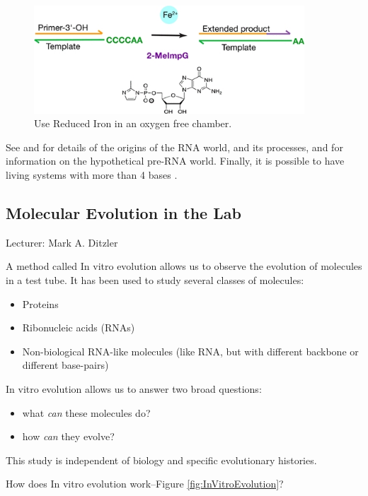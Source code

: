 \documentclass[]{article}
\begin{document}
\begin{figure}[H]
	\caption{Use Reduced Iron in an oxygen free chamber.}\label{fig:RNA_polymerization_via_iron}
	\includegraphics[width=0.9\textwidth]{RNA_polymerization_via_iron}
\end{figure}

See \cite{robertson2012origins} and  \cite{joyce2018protocells} for details of the origins of the RNA world, and its processes, and \cite{hud2018searching} for information on the hypothetical pre-RNA world. Finally, it is possible to have living systems with more than 4 bases  \cite{hoshika2019hachimoji}.

\subsection{Molecular Evolution in the Lab}

Lecturer: Mark A. Ditzler

A method called In vitro evolution allows us to observe the evolution of molecules in a test tube. It has been used to study several classes of molecules:
\begin{itemize}
	\item Proteins
	\item Ribonucleic acids (RNAs)
	\item Non-biological RNA-like molecules (like RNA, but with different backbone or different base-pairs)
\end{itemize}

In vitro evolution allows us to answer two broad questions:
\begin{itemize}
	\item what \textit{can} these molecules do?
	\item how \textit{can} they evolve?
\end{itemize}
This study is independent of biology and specific evolutionary histories.

How does In vitro evolution work--Figure \ref{fig:InVitroEvolution}?
\end{document}
